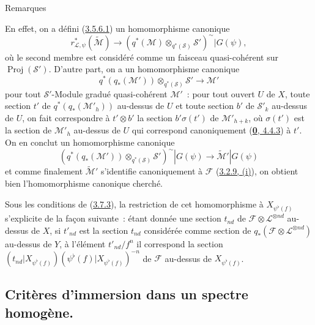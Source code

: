 \begin{namedtheorem}[3.7.9]{Remarques}
\begin{enumerate}
    En effet, on a défini (\hyperref[II.3.5.6.1-fr]{3.5.6.1}) un
    homomorphisme canonique
    \[
    \label{II.3.7.9.3-fr}
      r_{\mathcal{L},\psi}^*(\widetilde{\mathcal{M}})
      \longrightarrow
      (q^*(\mathcal{M})\otimes_{q^*(\mathcal{S})}\mathcal{S}')^{\sim}
      |G(\psi),
    \tag{3.7.9.3}
    \]
    où le second membre est considéré comme un faisceau quasi-cohérent sur
    $\operatorname{Proj}(\mathcal{S}')$. D'autre part, on a un
    homomorphisme canonique
    \[
    \label{II.3.7.9.4-fr}
      q^*(q_*(\mathcal{M}'))\otimes_{q^*(\mathcal{S})}\mathcal{S}'
      \longrightarrow\mathcal{M}'
    \tag{3.7.9.4}
    \]
    pour tout $\mathcal{S}'$-Module gradué quasi-cohérent $\mathcal{M}'$~:
    pour tout ouvert $U$ de $X$, toute section $t'$ de
    $q^*(q_*(\mathcal{M}'_h))$ au-dessus de $U$ et toute section $b'$ de
    $\mathcal{S}'_k$ au-dessus de $U$, on fait correspondre à $t'\otimes b'$ la
    section $b'\sigma(t')$ de $\mathcal{M}'_{h+k}$, où $\sigma(t')$ est la
    section de $\mathcal{M}'_h$ au-dessus de $U$ qui correspond canoniquement
    (\hyperref[0.4.4.3-fr]{\textbf{0}, 4.4.3}) à $t'$. On en conclut un homomorphisme
    canonique
    \[
    \label{II.3.7.9.5-fr}
      (q^*(q_*(\mathcal{M}'))\otimes_{q^*(\mathcal{S})}\mathcal{S}')^{\sim}
      |G(\psi)\longrightarrow\widetilde{\mathcal{M}}'|G(\psi)
    \tag{3.7.9.5}
    \]
    et comme finalement $\widetilde{\mathcal{M}}'$ s'identifie
    canoniquement à $\mathcal{F}$
    (\hyperref[II.3.2.9-fr]{3.2.9, (i)}), on obtient bien l'homomorphisme
    canonique cherché.

    Sous les conditions de (\hyperref[II.3.7.3-fr]{3.7.3}), la restriction
    de cet homomorphisme à $X_{\psi^\flat(f)}$ s'explicite de la façon
    suivante~: étant donnée une section $t_{nd}$ de
    $\mathcal{F}\otimes\mathcal{L}^{\otimes nd}$ au-dessus de $X$, si
    $t'_{nd}$ est la section $t_{nd}$ considérée comme section de
    $q_*(\mathcal{F}\otimes\mathcal{L}^{\otimes nd})$ au-dessus de $Y$, à
    l'élément $t'_{nd}/f^n$ il correspond la section
    $(t_{nd}|X_{\psi^\flat(f)})
    (\psi^\flat(f)|X_{\psi^\flat(f)})^{-n}$ de $\mathcal{F}$ au-dessus de
    $X_{\psi^\flat(f)}$.
\end{enumerate}
\end{namedtheorem}


\subsection{Critères d'immersion dans un spectre homogène.}
\label{subsection:II.3.8-fr}

